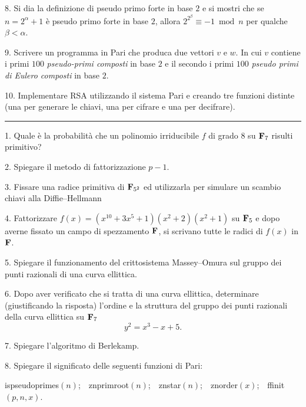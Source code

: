 \item{8.} Si dia la definizione di pseudo primo forte in base $2$ e si mostri che
se $n=2^\alpha+1$ \`{e} pseudo primo forte in base $2$, allora
$2^{2^\beta}\equiv -1\bmod n$ per qualche $\beta<\alpha$. \bigskip

\item{9.} Scrivere un programma in Pari che produca due vettori $v$ e $w$. In cui
$v$ contiene i primi $100$ {\it pseudo-primi composti} in base $2$ e il secondo i primi $100$
{\it pseudo primi di Eulero composti} in base $2$.
\bigskip

\item{10.} Implementare RSA utilizzando il sistema Pari e creando tre funzioni distinte (una per
generare le chiavi, una per cifrare e una per decifrare).\bigskip\bigskip

 \hrule
\bigskip\medskip
\item{1.} Quale \`{e} la probabilit\`{a} che un polinomio
irriducibile $f$ di grado $8$ su ${\bf F}_{7}$ risulti primitivo?
\bigskip

\item{2.} Spiegare il metodo di fattorizzazione $p-1$.
\bigskip

\item{3.} Fissare una radice primitiva di ${\bf F}_{5^2}$ ed
utilizzarla per simulare un scambio chiavi alla Diffie--Hellmann
\bigskip

\item{4.} Fattorizzare $f(x)=(x^{10}+3x^5+1)(x^2+2)(x^2+1)$ su ${\bf
F}_5$ e dopo averne fissato un campo di spezzamento ${\bf F}$,
si scrivano tutte le radici di $f(x)$ in ${\bf F}$.
\bigskip

\item{5.} Spiegare il funzionamento del crittosistema
Massey--Omura sul gruppo dei punti razionali di una curva
ellittica.

\bigskip \item{6.} Dopo aver verificato che si tratta di una curva
ellittica, determinare (giustificando la risposta) l'ordine e la
struttura del gruppo dei punti razionali della curva ellittica su
${\bf F}_7$
$$y^2=x^3-x+5.$$

\item{7.} Spiegare l'algoritmo di Berlekamp.
\bigskip

\item{8.} Spiegare il significato delle seguenti funzioni
di Pari:

ispseudoprimes$(n)$;\ \ znprimroot$(n)$;\ \ znstar$(n)$;\ \
znorder$(x)$;\ \ ffinit$(p, n, x)$.
\bigskip

